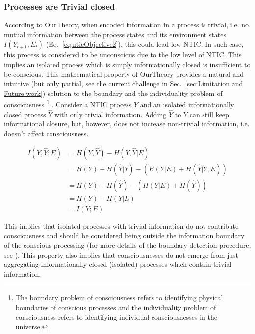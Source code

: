 \documentclass[utf8]{article}
\begin{document}
            \subsubsection*{Processes are Trivial closed}
                According to \ac{OurTheory}, when encoded information in a process is trivial, i.e. no mutual information between the process states and its environment states $I(Y_{t+1};E_{t})$ (Eq.~\ref{eq:nticObjective2}), this could lead low NTIC. In such case, this process is considered to be unconscious due to the low level of NTIC. This implies an isolated process which is simply informationally closed is insufficient to be conscious. 
                This mathematical property of \ac{OurTheory} provides a natural and intuitive (but only partial, see the current challenge in  Sec.~\ref{sec:Limitation and Future work}) solution to the boundary and the individuality problem of consciousness
                    \footnote{The boundary problem of consciousness refers to identifying physical boundaries of conscious processes and the individuality problem of consciousness refers to identifying individual consciousnesses in the universe.}
                \citep{Raymont2006-RAYUOC}. Consider a NTIC process $Y$ and an isolated informationally closed process $\hat{Y}$ with only trivial information. Adding $\hat{Y}$ to $Y$ can still keep informational closure, but, however, does not increase non-trivial information, i.e. doesn't affect consciousness. 
                
    			\begin{equation}
    			    \begin{aligned}
                        I(Y,\hat{Y};E) & = H(Y,\hat{Y}) - H(Y,\hat{Y}|E) \\
                                       & = H(Y) + H(\hat{Y}|Y) - (H(Y|E)+H(\hat{Y}|Y,E)) \\
                                       & = H(Y) + H(\hat{Y}) - (H(Y|E)+H(\hat{Y})) \\
                                       & = H(Y) - H(Y|E)\\
                                       & = I(Y;E)				
    				\end{aligned}
    			\end{equation}
                
                This implies that isolated processes with trivial information do not contribute consciousness and should be considered being outside the information boundary of the conscious processing (for more details of the boundary detection procedure, see \cite{krakauer2014information}). 
                This property also implies that consciousnesses do not emerge from just aggregating informationally closed (isolated) processes which contain trivial information.%
                
\end{document}
